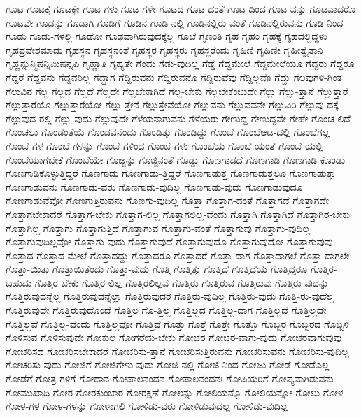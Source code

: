 {ಗೂಟ
ಗೂಟಕ್ಕೆ
ಗೂಟಕ್ಕೇ
ಗೂಟ-ಗಳು
ಗೂಟ-ಗಳೇ
ಗೂಟದ
ಗೂಟ-ದಂತೆ
ಗೂಟ-ದಿಂದ
ಗೂಟ-ವನ್ನು
ಗೂಟವಾದರೊ
ಗೂಟವೇ
ಗೂಡನ್ನು
ಗೂಡಾಗಿ
ಗೂಡಿಗೆ
ಗೂಡಿನ
ಗೂಡಿ-ನಲ್ಲಿ
ಗೂಡಿನಲ್ಲಿರು-ವಂತೆ
ಗೂಡಿನಲ್ಲಿರುವನು
ಗೂಡಿ-ನಿಂದ
ಗೂಡು
ಗೂಡು-ಗಳಲ್ಲಿ
ಗೂಡೋ
ಗೂಢವಾಗಿರುವುದಕ್ಕೆಲ್ಲ
ಗೂಬೆ
ಗೃಣಂತಿ
ಗೃಹ
ಗೃಹಂ
ಗೃಹಕ್ಕೆ
ಗೃಹದಲ್ಲಿದ್ದಳು
ಗೃಹಪ್ರವೇಶಮಾಡು
ಗೃಹಸ್ಥನ
ಗೃಹಸ್ಥನಂತೆ
ಗೃಹಸ್ಥರ
ಗೃಹಸ್ಥರು
ಗೃಹಸ್ಥರೆಂದು
ಗೃಹಿಣಿ
ಗೃಹಿಣೀ
ಗೃಹೀತ್ವೈತಾನಿ
ಗೃಹ್ಣನ್ನುನ್ಮಿಷನ್ನಿಮಿಷನ್ನಪಿ
ಗೃಹ್ಣಾತಿ
ಗೃಹ್ಯತೇ
ಗೆಂದು
ಗೆಡು-ವುದಿಲ್ಲ
ಗೆಡ್ಡೆ
ಗೆದ್ದಮೇಲೆ
ಗೆದ್ದಮೇಲೆಯೂ
ಗೆದ್ದರು
ಗೆದ್ದರೂ
ಗೆದ್ದರೆ
ಗೆದ್ದವನು
ಗೆದ್ದವರಿಲ್ಲ
ಗೆದ್ದಾಗ
ಗೆದ್ದಿರುವನು
ಗೆದ್ದಿರುವನೊ
ಗೆದ್ದಿರುವೆವು
ಗೆದ್ದಿಲ್ಲವೊ
ಗೆದ್ದು
ಗೆಲವುಗಳಿ-ಗಿಂತ
ಗೆಲುವಿನ
ಗೆಲ್ಲ
ಗೆಲ್ಲದ
ಗೆಲ್ಲದೆ
ಗೆಲ್ಲದೇ
ಗೆಲ್ಲಬೇಕಾಗಿದೆ
ಗೆಲ್ಲ-ಬೇಕು
ಗೆಲ್ಲಬೇಕೆಂಬುದೇ
ಗೆಲ್ಲು
ಗೆಲ್ಲು-ತ್ತಾನೆ
ಗೆಲ್ಲುತ್ತಾರೆ
ಗೆಲ್ಲುತ್ತಾರೆಯೊ
ಗೆಲ್ಲುತ್ತಾರೆಯೋ
ಗೆಲ್ಲು-ತ್ತೇನೆ
ಗೆಲ್ಲುತ್ತೇವೆಯೋ
ಗೆಲ್ಲುವನು
ಗೆಲ್ಲುವವನೇ
ಗೆಲ್ಲುವಿರಿ
ಗೆಲ್ಲುವು-ದಕ್ಕೆ
ಗೆಲ್ಲುವುದ-ರಲ್ಲಿ
ಗೆಲ್ಲು-ವುದು
ಗೆಲ್ಲುವುದೇ
ಗೆಳೆಯನಾಗುವನು
ಗೆಳೆಯರು
ಗೇಣುದ್ದ
ಗೇಣುದ್ದವೇ
ಗೇಹೇ
ಗೊಂಚ-ಲಿದೆ
ಗೊಂಚಲು
ಗೊಂಡಂತೆಯೆ
ಗೊಂಡವನೆಂದು
ಗೊಂಡಿತ್ತು
ಗೊಂಡಿದ್ದು
ಗೊಂಬೆ
ಗೊಂಬೆಆಟ-ದಲ್ಲಿ
ಗೊಂಬೆಗಲ್ಲ
ಗೊಂಬೆ-ಗಳ
ಗೊಂಬೆ-ಗಳನ್ನು
ಗೊಂಬೆ-ಗಳಿಂದ
ಗೊಂಬೆ-ಗಳು
ಗೊಂಬೆಯ
ಗೊಂಬೆ-ಯಂತೆ
ಗೊಂಬೆ-ಯಲ್ಲಿ
ಗೊಂಬೆಯಾಗಬೇಕೆ
ಗೊಂಬೆಯೇ
ಗೊಜ್ಜನ್ನು
ಗೊಜ್ಜಿನಂತೆ
ಗೊಡ್ಡು
ಗೊಣಗಾಡದೆ
ಗೊಣಗಾಡಿ
ಗೊಣಗಾಡಿ-ಕೊಂಡು
ಗೊಣಗಾಡಿಕೊಳ್ಳುತ್ತಿದ್ದರೆ
ಗೊಣಗಾಡು
ಗೊಣಗಾಡು-ತ್ತಿದ್ದರೆ
ಗೊಣಗಾಡುತ್ತ
ಗೊಣಗಾಡುತ್ತಲೂ
ಗೊಣಗಾಡುತ್ತಾ
ಗೊಣಗಾಡುವನು
ಗೊಣಗಾಡು-ವರು
ಗೊಣಗಾಡು-ವುದಿಲ್ಲ
ಗೊಣಗಾಡು-ವುದು
ಗೊಣಗಾಡುವುದೂ
ಗೊಣಗಾಡುವೆವೋ
ಗೊಣಗುತ್ತಿರುವನು
ಗೊಣಗು-ವುದಿಲ್ಲ
ಗೊತ್ತಾ
ಗೊತ್ತಾಗ-ದಂತೆ
ಗೊತ್ತಾಗದೆ
ಗೊತ್ತಾಗದೇ
ಗೊತ್ತಾಗಬೇಕಾದರೆ
ಗೊತ್ತಾಗ-ಬೇಕು
ಗೊತ್ತಾಗ-ಲಿಲ್ಲ
ಗೊತ್ತಾಗಲಿಲ್ಲ-ವೆಂದು
ಗೊತ್ತಾಗಿ
ಗೊತ್ತಾಗಿದೆ
ಗೊತ್ತಾಗಿರ-ಬೇಕು
ಗೊತ್ತಾಗಿಲ್ಲ
ಗೊತ್ತಾಗು
ಗೊತ್ತಾಗುತ್ತಿದೆ
ಗೊತ್ತಾಗುವ
ಗೊತ್ತಾಗು-ವಂತೆ
ಗೊತ್ತಾಗುವು
ಗೊತ್ತಾಗು-ವುದಿಲ್ಲ
ಗೊತ್ತಾಗುವುದಿಲ್ಲವೋ
ಗೊತ್ತಾಗು-ವುದು
ಗೊತ್ತಾಗುವುದೆ
ಗೊತ್ತಾಗುವುದೊ
ಗೊತ್ತಾಗುವುದೋ
ಗೊತ್ತಾಗುವುವು
ಗೊತ್ತಾದ
ಗೊತ್ತಾದ-ಮೇಲೆ
ಗೊತ್ತಾದದ್ದು
ಗೊತ್ತಾದರೂ
ಗೊತ್ತಾದರೆ
ಗೊತ್ತಾ-ದಾಗ
ಗೊತ್ತಾದಾಗಲೆ
ಗೊತ್ತಾ-ದಾಗಲೇ
ಗೊತ್ತಾ-ಯಿತು
ಗೊತ್ತಾಯಿತೆಂದು
ಗೊತ್ತಾ-ವುದು
ಗೊತ್ತಿ
ಗೊತ್ತಿತ್ತು
ಗೊತ್ತಿದೆ
ಗೊತ್ತಿದೆಯೆ
ಗೊತ್ತಿದ್ದರೂ
ಗೊತ್ತಿರ-ಬಹುದು
ಗೊತ್ತಿರ-ಬೇಕು
ಗೊತ್ತಿರ-ಲಿಲ್ಲ
ಗೊತ್ತಿರಲಿಲ್ಲವೆ
ಗೊತ್ತಿರು
ಗೊತ್ತಿರುವ
ಗೊತ್ತಿರುವು
ಗೊತ್ತಿರು-ವುದನ್ನು
ಗೊತ್ತಿರುವುದನ್ನೆಲ್ಲ
ಗೊತ್ತಿರುವುದನ್ನೆಲ್ಲಾ
ಗೊತ್ತಿರುವುದರ
ಗೊತ್ತಿರು-ವುದಿಲ್ಲ
ಗೊತ್ತಿರು-ವುದು
ಗೊತ್ತಿ-ರು-ವುದೆಲ್ಲ
ಗೊತ್ತಿರುವುದೇ
ಗೊತ್ತಿರುವುದೊಂದೆ
ಗೊತ್ತಿಲ
ಗೊ-ತ್ತಿಲ್ಲ
ಗೊತ್ತಿಲ್ಲದ
ಗೊತ್ತಿಲ್ಲ-ದಾಗ
ಗೊತ್ತಿಲ್ಲದೆ
ಗೊತ್ತಿಲ್ಲದೇ
ಗೊತ್ತಿಲ್ಲವೆ
ಗೊತ್ತಿಲ್ಲ-ವೆಂದು
ಗೊತ್ತಿಲ್ಲವೋ
ಗೊತ್ತಿವೆ
ಗೊತ್ತು
ಗೊತ್ತೆ
ಗೊತ್ತೇ
ಗೊತ್ತೊ
ಗೊಬ್ಬರ
ಗೊಬ್ಬರದ
ಗೊಬ್ಬಳಿ
ಗೊಳಿಸುವ
ಗೊಳಿಸುವುದೇ
ಗೋಕುಲ
ಗೋಗರೆಯ-ಬೇಕು
ಗೋಚರ
ಗೋಚರ-ವಾಗು-ವುದು
ಗೋಚರವಾಗುವುವು
ಗೋಚರಿಸದ
ಗೋಚರಿಸಬೇಕಾದರೆ
ಗೋಚರಿಸು-ತ್ತಾನೆ
ಗೋಚರಿಸುತ್ತಿರುವನು
ಗೋಚರಿಸುವನು
ಗೋಚರಿಸು-ವುದಿಲ್ಲ
ಗೋಚರಿಸು-ವುದು
ಗೋಜಿಗೆ
ಗೋಜಿಗೇಳು-ವುದು
ಗೋಜಿ-ನಲ್ಲಿ
ಗೋಜಿ-ನಿಂದ
ಗೋಜು
ಗೋಡೆ
ಗೋಡೆಎಲ್ಲ
ಗೋಡೆಗೆ
ಗೋತ್ರ-ಗಳಿಗೆ
ಗೋದಾನ
ಗೋಪಾಲನಂದನ
ಗೋಪಾಲನಂದನಃ
ಗೋಪಿಯರಿಗೆ
ಗೋಪ್ಯವಾಗಿಡುವನು
ಗೋಮುಖಾದಿ
ಗೋರ
ಗೋರಕುಂಬಾರ
ಗೋರಕ್ಷಣೆ
ಗೋಲನ್ನು
ಗೋಲಿಯನ್ನೊ
ಗೋಲಿಯನ್ನೋ
ಗೋಲು
ಗೋಳ
ಗೋಳ-ಗಳ
ಗೋಳ-ಗಳನ್ನು
ಗೋಳಾಗಲಿ
ಗೋಳಿಡು-ವರು
ಗೋಳಿಡುವುದಲ್ಲ
ಗೋಳಿಡು-ವುದಿಲ್ಲ
}
